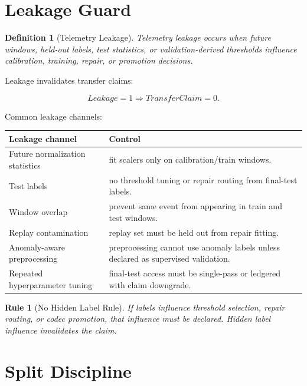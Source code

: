 \documentclass[12pt]{article}
\newtheorem{definition}{Definition}
\newtheorem{rulebox}{Rule}
\begin{document}
\section{Leakage Guard}

\begin{definition}[Telemetry Leakage]
Telemetry leakage occurs when future windows, held-out labels, test statistics,
or validation-derived thresholds influence calibration, training, repair, or
promotion decisions.
\end{definition}

Leakage invalidates transfer claims:

\[
Leakage=1\Rightarrow TransferClaim=0.
\]

Common leakage channels:

\begin{longtable}{p{}p{}}
\toprule
\textbf{Leakage channel} & \textbf{Control} \\
\midrule
Future normalization statistics & fit scalers only on calibration/train windows. \\
Test labels & no threshold tuning or repair routing from final-test labels. \\
Window overlap & prevent same event from appearing in train and test windows. \\
Replay contamination & replay set must be held out from repair fitting. \\
Anomaly-aware preprocessing & preprocessing cannot use anomaly labels unless declared as supervised validation. \\
Repeated hyperparameter tuning & final-test access must be single-pass or ledgered with claim downgrade. \\
\bottomrule
\end{longtable}

\begin{rulebox}[No Hidden Label Rule]
If labels influence threshold selection, repair routing, or codec promotion,
that influence must be declared. Hidden label influence invalidates the claim.
\end{rulebox}

\section{Split Discipline}
\end{document}
